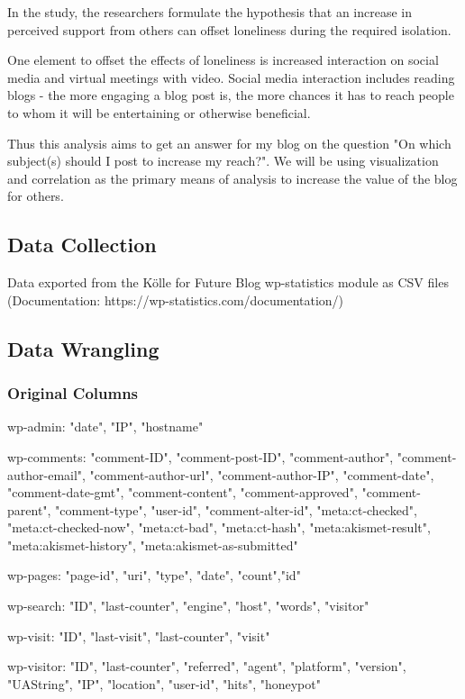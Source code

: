 In the study, the researchers formulate the hypothesis that an increase in perceived support from others can offset loneliness during the required isolation.

One element to offset the effects of loneliness is increased interaction on social media and virtual meetings with video. Social media interaction includes reading blogs - the more engaging a blog post is, the more chances it has to reach people to whom it will be entertaining or otherwise beneficial.

Thus this analysis aims to get an answer for my blog on the question "On which subject(s) should I post to increase my reach?". We will be using visualization and correlation as the primary means of analysis to increase the value of the blog for others.

\subsection{Data Collection}

Data exported from the Kölle for Future Blog wp-statistics module as CSV files (Documentation: https://wp-statistics.com/documentation/)

\subsection{Data Wrangling}

\subsubsection{Original Columns}

wp-admin: "date", "IP", "hostname"

wp-comments: "comment-ID", "comment-post-ID", "comment-author", "comment-author-email", "comment-author-url", "comment-author-IP", "comment-date", "comment-date-gmt", "comment-content", "comment-approved", "comment-parent", "comment-type", "user-id", "comment-alter-id", "meta:ct-checked", "meta:ct-checked-now", "meta:ct-bad", "meta:ct-hash", "meta:akismet-result", "meta:akismet-history", "meta:akismet-as-submitted"

wp-pages: "page-id", "uri", "type", "date", "count","id"

wp-search: "ID", "last-counter", "engine", "host", "words", "visitor"

wp-visit: "ID", "last-visit", "last-counter", "visit"

wp-visitor: "ID", "last-counter", "referred", "agent", "platform", "version", "UAString", "IP", "location", "user-id", "hits", "honeypot"

